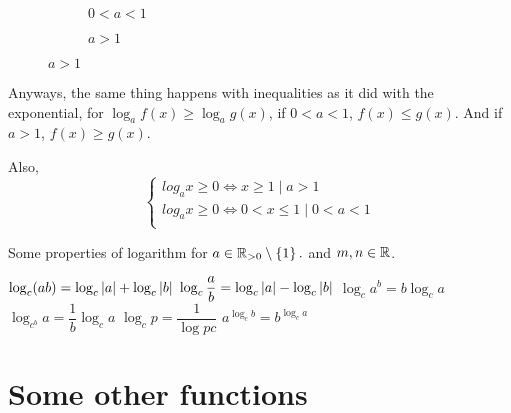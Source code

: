 \begin{figure}
    [H]
    \centering 
    \begin{subfigure}{0.5\textwidth}
        \caption{\(0 < a < 1\)}
    \end{subfigure}%
    \begin{subfigure}{0.5\textwidth}
        \caption{\(a > 1\)}
    \end{subfigure}
\end{figure}

Anyways, the same thing happens with inequalities as it did with the exponential,
for \(\log_{a}f(x) \ge \log_{a} g(x)\), if \(0 < a < 1\), \(f(x) \le g(x)\). And if
\(a > 1\), \(f(x) \ge g(x)\). 

Also, 
\[
    \begin{cases}
        log_{a} x \ge 0 \iff x \ge 1 \mid a > 1 \\
        log_{a} x \ge 0 \iff 0< x \le 1 \mid 0 < a < 1 \\
    \end{cases}
\]

\begin{proposition}
    Some properties of logarithm for \(a \in \mathbb R_{>0} \setminus \left\{1\right\}. \) and
    \(m, n \in \mathbb R\).  
    \begin{enumerate}
        \ii \(\log_{c}(ab) = \log_{c}\abs{a} + \log_{c}\abs{b}\)
        \ii \(\log_{c}\dfrac{a}{b} = \log_{c}\abs{a} - \log_{c}\abs{b}\)
        \ii \(\log_{c}{a^b} = b\log_{c}{a}\)
        \ii \(\log_{c^b}{a} = \dfrac{1}{b}\log_{c}{a}\)
        \ii \(\log_{c}p = \dfrac{1}{\log{p}c}\)
        \ii \(a^{\log_{c}b} = b^{\log_{c}a}\)
    \end{enumerate}
\end{proposition}

\section{Some other functions}

